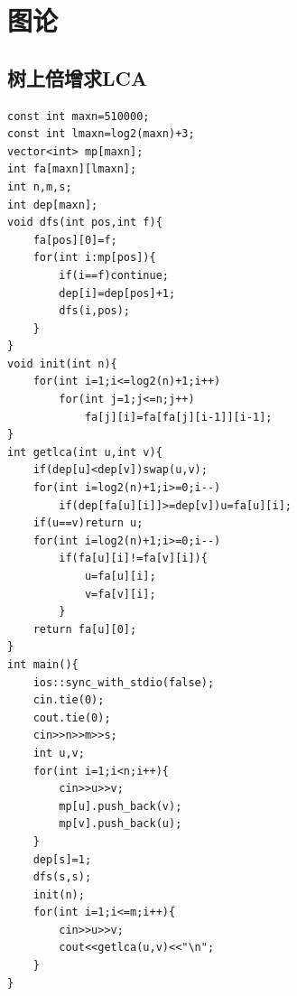\documentclass[a4]{ctexart}
\begin{document}
\section{图论}
\subsection{树上倍增求LCA}
\begin{lstlisting}
const int maxn=510000;
const int lmaxn=log2(maxn)+3;
vector<int> mp[maxn];
int fa[maxn][lmaxn];
int n,m,s;
int dep[maxn];
void dfs(int pos,int f){
    fa[pos][0]=f;
    for(int i:mp[pos]){
        if(i==f)continue;
        dep[i]=dep[pos]+1;
        dfs(i,pos);
    }
}
void init(int n){
    for(int i=1;i<=log2(n)+1;i++)
        for(int j=1;j<=n;j++)
            fa[j][i]=fa[fa[j][i-1]][i-1];
}
int getlca(int u,int v){
    if(dep[u]<dep[v])swap(u,v);
    for(int i=log2(n)+1;i>=0;i--)
        if(dep[fa[u][i]]>=dep[v])u=fa[u][i];
    if(u==v)return u;
    for(int i=log2(n)+1;i>=0;i--)
        if(fa[u][i]!=fa[v][i]){
            u=fa[u][i];
            v=fa[v][i];
        }
    return fa[u][0];
}
int main(){
    ios::sync_with_stdio(false);
    cin.tie(0);   
    cout.tie(0);
    cin>>n>>m>>s;
    int u,v;
    for(int i=1;i<n;i++){
        cin>>u>>v;
        mp[u].push_back(v);
        mp[v].push_back(u);
    }
    dep[s]=1;
    dfs(s,s);
    init(n);
    for(int i=1;i<=m;i++){
        cin>>u>>v;
        cout<<getlca(u,v)<<"\n";
    }
}
\end{lstlisting}
\end{document}
